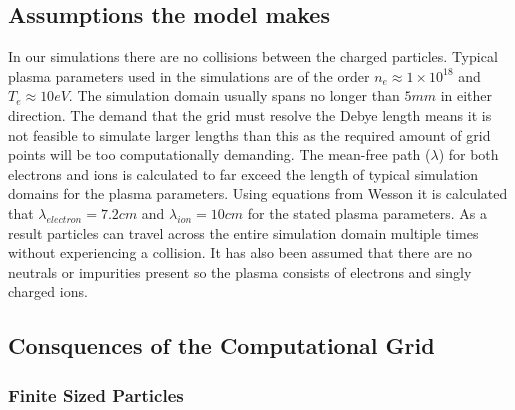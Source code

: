 \subsection{Assumptions the model makes}
In our simulations there are no collisions between the charged particles. Typical plasma parameters used in the simulations are of the order $n_e \approx 1 \times 10^{18}$ and $T_e \approx 10eV$. The simulation domain usually spans no longer than $5mm$ in either direction. The demand that the grid must resolve the Debye length means it is not feasible to simulate larger lengths than this as the required amount of grid points will be too computationally demanding.    The mean-free path ($\lambda$) for both electrons and ions is calculated to far exceed the length of typical simulation domains  for the plasma parameters. Using equations from Wesson \cite{Wesson} it is calculated that $\lambda_{electron} = 7.2cm$ and $\lambda_{ion} = 10cm$ for the stated plasma parameters.  As a result particles can travel across the entire simulation domain multiple times without experiencing a collision. It has also been assumed that there are no neutrals or impurities present so the plasma consists of electrons and singly charged ions. %

\subsection{Consquences of the Computational Grid} \label{Section:grid}
\subsubsection{Finite Sized Particles}

